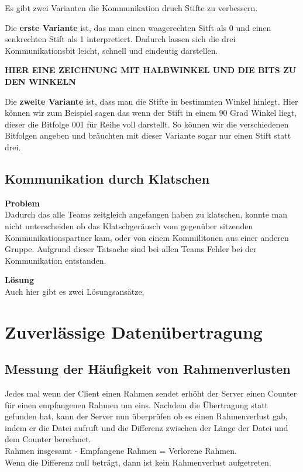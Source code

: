 \documentclass{scrartcl}
\begin{document}
  Es gibt zwei Varianten die Kommunikation druch Stifte zu verbessern.
  
  Die \textbf{erste Variante} ist, das man einen waagerechten Sitft als 0 und einen senkrechten Stift als 1 interpretiert. Dadurch lassen sich die drei Kommunikationsbit leicht, schnell und eindeutig darstellen.
  
  \textbf{HIER EINE ZEICHNUNG MIT HALBWINKEL UND DIE BITS ZU DEN WINKELN}
  
  Die \textbf{zweite Variante} ist, dass man die Stifte in bestimmten Winkel hinlegt. Hier können wir zum Beispiel sagen das wenn der Stift in einem 90 Grad Winkel liegt, dieser die Bitfolge 001 für Reihe voll darstellt. So können wir die verschiedenen Bitfolgen angeben und bräuchten mit dieser Variante sogar nur einen Stift statt drei.
  
   \subsection[Aufgabe 6 Kommunikation durch Klatschen]{Kommunikation durch Klatschen}
   
   \textbf{Problem}\\
   Dadurch das alle Teams zeitgleich angefangen haben zu klatschen, konnte man nicht unterscheiden ob das Klatschgeräusch vom gegenüber sitzenden Kommunikationspartner kam, oder von einem Kommilitonen aus einer anderen Gruppe. Aufgrund dieser Tatsache sind bei allen Teams Fehler bei der Kommunikation entstanden.
   
   \textbf{Lösung}\\
   Auch hier gibt es zwei Lösungsansätze, 
  
  
  
  \newpage
\section[Versuch 2 Zuverlässige Datenübertragung]{Zuverlässige Datenübertragung}
  \subsection[Aufgabe 2 Messung der Häufigkeit von Rahmenverlusten]{Messung der Häufigkeit von Rahmenverlusten}
  
  Jedes mal wenn der Client einen Rahmen sendet erhöht der Server einen Counter für einen empfangenen Rahmen um eins. Nachdem die Übertragung statt gefunden hat, kann der Server nun überprüfen ob es einen Rahmenverlust gab, indem er die Datei aufruft und die Differenz zwischen der Länge der Datei und dem Counter berechnet. \\
Rahmen insgesamt - Empfangene  Rahmen = Verlorene Rahmen.\\
Wenn die Differenz null beträgt, dann ist kein Rahmenverlust aufgetreten.
\end{document}
